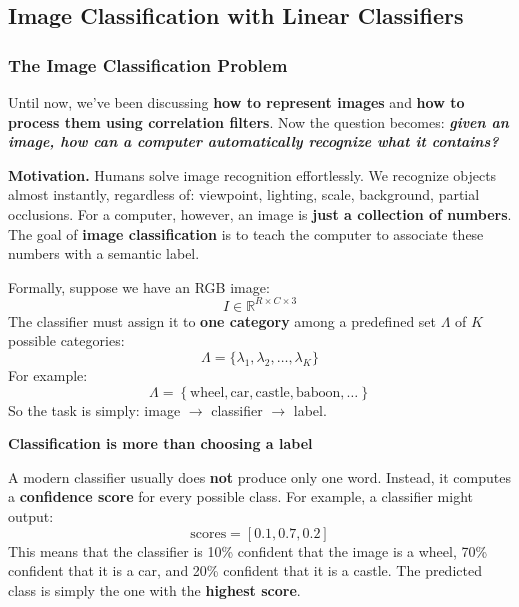 \subsection{Image Classification with Linear Classifiers}\label{sec:image-classification-with-linear-classifiers}

\subsubsection{The Image Classification Problem}\label{sec:the-image-classification-problem}

Until now, we've been discussing \textbf{how to represent images} and \textbf{how to process them using correlation filters}. Now the question becomes: \emph{\textbf{given an image, how can a computer automatically recognize what it contains?}}

\highspace
\textcolor{Green3}{ \textbf{Motivation.}} Humans solve image recognition effortlessly. We recognize objects almost instantly, regardless of: viewpoint, lighting, scale, background, partial occlusions. For a computer, however, an image is \textbf{just a collection of numbers}. The goal of \textbf{image classification} is to teach the computer to associate these numbers with a semantic label.

\highspace
Formally, suppose we have an RGB image:
\begin{equation*}
    I \in \mathbb{R}^{R \times C \times 3}
\end{equation*}
The classifier must assign it to \textbf{one category} among a predefined set $\Lambda$ of $K$ possible categories:
\begin{equation*}
    \Lambda = \{ \lambda_1, \lambda_2, \ldots, \lambda_K \}
\end{equation*}
For example:
\begin{equation*}
    \Lambda = \left\{\text{wheel}, \text{car}, \text{castle}, \text{baboon}, \dots\right\}
\end{equation*}
So the task is simply: image $\to$ classifier $\to$ label.

\highspace
\begin{flushleft}
    \textcolor{Red2}{ \textbf{Classification is more than choosing a label}}
\end{flushleft}
A modern classifier usually does \textbf{not} produce only one word. Instead, it computes a \textbf{confidence score} for every possible class. For example, a classifier might output:
\begin{equation*}
    \text{scores} = \left[0.1, 0.7, 0.2\right]
\end{equation*}
This means that the classifier is 10\% confident that the image is a wheel, 70\% confident that it is a car, and 20\% confident that it is a castle. The predicted class is simply the one with the \textbf{highest score}.

